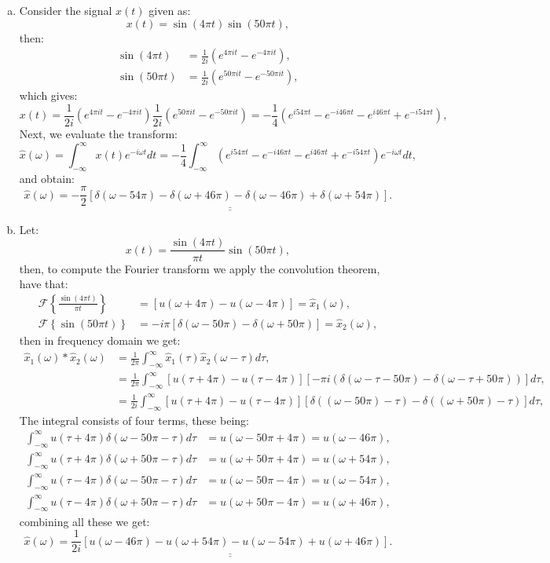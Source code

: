\begin{enumerate}
\begin{enumerate}[a)]
\item Consider the signal $x(t)$ given as:
$$x(t)=\sin(4\pi t)\sin(50\pi t),$$
then:
\begin{align*}
    \sin(4\pi t)&=\frac{1}{2i}(e^{4\pi i t}-e^{-4\pi it}), \\
    \sin(50\pi t)&=\frac{1}{2i}(e^{50\pi it}-e^{-50\pi it}),
\end{align*}
which gives:
$$x(t)=\frac{1}{2i}\left(e^{4\pi it}-e^{-4\pi it}\right)\frac{1}{2i}\left(e^{50\pi it}-e^{-50\pi it}\right)=-\frac{1}{4}\left(e^{i54\pi t}-e^{-i46\pi t}-e^{i46\pi t}+e^{-i54\pi t}\right),$$
Next, we evaluate the transform:
$$\hat{x}(\omega)=\int_{-\infty}^{\infty}x(t)e^{-i\omega t}dt=-\frac{1}{4}\int_{-\infty}^{\infty}\left(e^{i54\pi t}-e^{-i46\pi t}-e^{i46\pi t}+e^{-i54\pi t}\right)e^{-i\omega t}dt,$$
and obtain:
$$\hat{x}(\omega)=\underline{\underline{-\frac{\pi}{2}[\delta(\omega-54\pi)-\delta(\omega+46\pi)-\delta(\omega-46\pi)+\delta(\omega+54\pi)]}}.$$

\item Let:
$$x(t)=\frac{\sin(4\pi t)}{\pi t}\sin(50\pi t),$$
then, to compute the Fourier transform we apply the convolution theorem, have that:
\begin{align*}
    \mathcal{F}\left\{\frac{\sin(4\pi t)}{\pi t}\right\}&=[u(\omega+4\pi)-u(\omega-4\pi)]=\hat{x}_{1}(\omega), \\
    \mathcal{F}\left\{\sin(50\pi t)\right\}&=-i\pi[\delta(\omega-50\pi)-\delta(\omega+50\pi)]=\hat{x}_{2}(\omega),
\end{align*}
then in frequency domain we get:
\begin{align*}
\hat{x}_{1}(\omega)*\hat{x}_{2}(\omega)&=\frac{1}{2\pi}\int_{-\infty}^{\infty}\hat{x}_{1}(\tau)\hat{x}_{2}(\omega-\tau)d\tau, \\
&=\frac{1}{2\pi}\int_{-\infty}^{\infty}[u(\tau+4\pi)-u(\tau-4\pi)][-\pi i(\delta(\omega-\tau-50\pi)-\delta(\omega-\tau+50\pi))]d\tau, \\
&=\frac{1}{2i}\int_{-\infty}^{\infty}[u(\tau+4\pi)-u(\tau-4\pi)][\delta((\omega-50\pi)-\tau)-\delta((\omega+50\pi)-\tau)]d\tau,
\end{align*}
The integral consists of four terms, these being:
\begin{align*}
    \int_{-\infty}^{\infty}u(\tau+4\pi)\delta(\omega-50\pi-\tau)d\tau&=u(\omega-50\pi+4\pi)=u(\omega-46\pi), \\
    \int_{-\infty}^{\infty}u(\tau+4\pi)\delta(\omega+50\pi-\tau)d\tau&=u(\omega+50\pi+4\pi)=u(\omega+54\pi), \\
    \int_{-\infty}^{\infty}u(\tau-4\pi)\delta(\omega-50\pi-\tau)d\tau&=u(\omega-50\pi-4\pi)=u(\omega-54\pi), \\
    \int_{-\infty}^{\infty}u(\tau-4\pi)\delta(\omega+50\pi-\tau)d\tau&=u(\omega+50\pi-4\pi)=u(\omega+46\pi),
\end{align*}
combining all these we get:
$$\hat{x}(\omega)=\underline{\underline{\frac{1}{2i}[u(\omega-46\pi)-u(\omega+54\pi)-u(\omega-54\pi)+u(\omega+46\pi)]}}.$$


\end{enumerate}
\end{enumerate}
